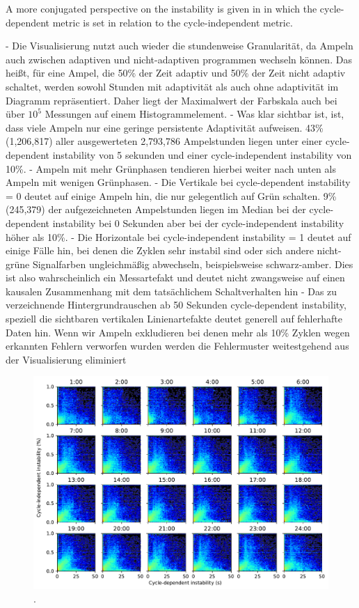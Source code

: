 A more conjugated perspective on the instability is given in  in which the cycle-dependent metric is set in relation to the cycle-independent metric.  

- Die Visualisierung nutzt auch wieder die stundenweise Granularität, da Ampeln auch zwischen adaptiven und nicht-adaptiven programmen wechseln können. Das heißt, für eine Ampel, die 50\% der Zeit adaptiv und 50\% der Zeit nicht adaptiv schaltet, werden sowohl Stunden mit adaptivität als auch ohne adaptivität im Diagramm repräsentiert. Daher liegt der Maximalwert der Farbskala auch bei über $10^5$ Messungen auf einem Histogrammelement.
- Was klar sichtbar ist, ist, dass viele Ampeln nur eine geringe persistente Adaptivität aufweisen. 43\% (1,206,817) aller ausgewerteten 2,793,786 Ampelstunden liegen unter einer cycle-dependent instability von 5 sekunden und einer cycle-independent instability von 10\%. 
- Ampeln mit mehr Grünphasen tendieren hierbei weiter nach unten als Ampeln mit wenigen Grünphasen. 
- Die Vertikale bei cycle-dependent instability = 0 deutet auf einige Ampeln hin, die nur gelegentlich auf Grün schalten. 9\% (245,379) der aufgezeichneten Ampelstunden liegen im Median bei der cycle-dependent instability bei 0 Sekunden aber bei der cycle-independent instability höher als 10\%.
- Die Horizontale bei cycle-independent instability = 1 deutet auf einige Fälle hin, bei denen die Zyklen sehr instabil sind oder sich andere nicht-grüne Signalfarben ungleichmäßig abwechseln, beispielsweise schwarz-amber. Dies ist also wahrscheinlich ein Messartefakt und deutet nicht zwangsweise auf einen kausalen Zusammenhang mit dem tatsächlichem Schaltverhalten hin
- Das zu verzeichnende Hintergrundrauschen ab 50 Sekunden cycle-dependent instability, speziell die sichtbaren vertikalen Linienartefakte deutet generell auf fehlerhafte Daten hin. Wenn wir Ampeln exkludieren bei denen mehr als 10\% Zyklen wegen erkannten Fehlern verworfen wurden werden die Fehlermuster weitestgehend aus der Visualisierung eliminiert

\begin{figure}[t]
    \centering
    \includegraphics[width=\linewidth]{images/predictability-heatmap-hourly.pdf}
    \caption{.}\label{fig:predictability-heatmap-hourly}
\end{figure}

